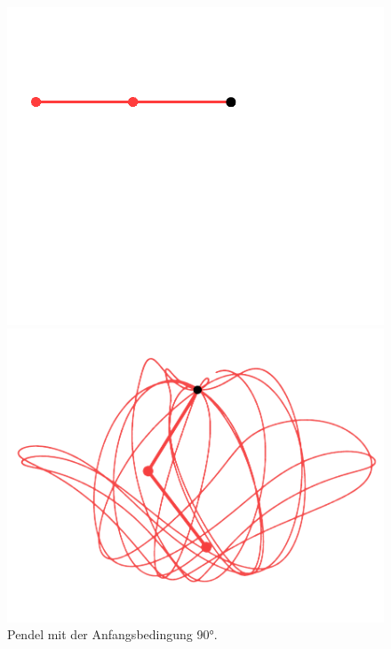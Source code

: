 \begin{figure}
\begin{minipage}{0.45\textwidth}
    \end{minipage}
    \caption{Pendel mit der Anfangsbedingung 90°.}
    \label{fig:pendel_bei_90}
    \centering
    \begin{minipage}{0.45\textwidth}
        \centering
        \includegraphics[width=\textwidth]{papers/doppelpendel/images/pendel_stand_kleiner_90.png}
    \end{minipage}
    \hfill
    \begin{minipage}{0.45\textwidth}
        \centering
        \includegraphics[width=\textwidth]{papers/doppelpendel/images/pendel_spur_kleiner_90.png}

\end{minipage}
\end{figure}
